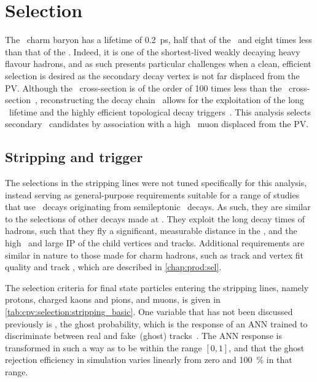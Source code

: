 \chapter{Selection}
\label{chap:cpv:selection}

The \PLambdac\ charm baryon has a lifetime of \SI{0.2}{\pico\second}, half that 
of the \PDzero\ and eight times less than that of the \PBzero.
Indeed, it is one of the shortest-lived weakly decaying heavy flavour hadrons, 
and as such presents particular challenges when a clean, efficient selection is 
desired as the secondary decay vertex is not far displaced from the \ac{PV}.
Although the \bbbar\ cross-section is of the order of 100 times less than the 
\ccbar\ cross-section~\cite{LHCb-PAPER-2012-041,LHCb-PAPER-2013-004}, 
reconstructing the decay chain \LbToLcmuX\ allows for the exploitation of the 
long \PLambdab\ lifetime and the highly efficient topological \Pbottom decay 
triggers~\cite{Gligorov:1384380,Gligorov:2011qxa}.
This analysis selects secondary \PLambdac\ candidates by association with a 
high \pT\ muon displaced from the \ac{PV}.

\section{Stripping and trigger}
\label{chap:cpv:selection:stripping_trigger}

The selections in the stripping lines were not tuned specifically for this 
analysis, instead serving as general-purpose requirements suitable for a range 
of studies that use \LcTophh\ decays originating from semileptonic \PLambdab\ 
decays.
As such, they are similar to the selections of other \Pbottom decays made at 
\lhcb.
They exploit the long decay times of \Pbottom hadrons, such that they fly a 
significant, measurable distance in the \velo, and the high \pT\ and large 
\acl{IP} of the child vertices and tracks.
Additional requirements are similar in nature to those made for charm hadrons, 
such as track and vertex fit quality and track \ipchisq, which are described in 
\cref{chap:prod:sel}.

The selection criteria for final state particles entering the stripping lines, 
namely protons, charged kaons and pions, and muons, is given in 
\cref{tab:cpv:selection:stripping_basic}.
One variable that has not been discussed previously is \pghost, the ghost 
probability, which is the response of an \ac{ANN} trained to discriminate 
between real and fake~(ghost) tracks~\cite{Brehmer:1478372}.
The \ac{ANN} response is transformed in such a way as to be within the range 
$[0, 1]$, and that the ghost rejection efficiency in simulation varies linearly 
from zero and \SI{100}{\percent} in that range.

